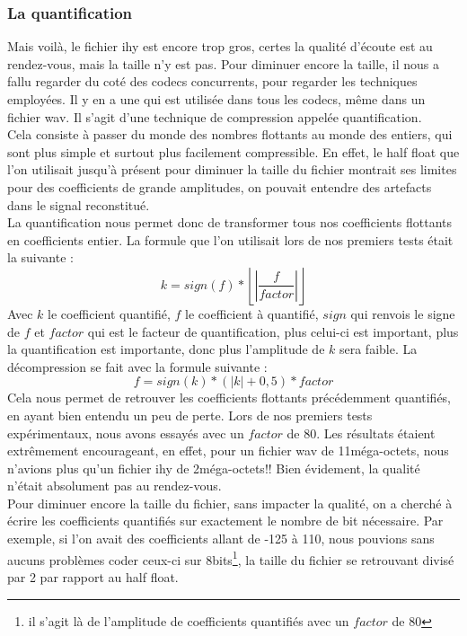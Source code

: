\documentclass[a4paper,12pt]{report}
\begin{document}
\subsubsection{La quantification}
Mais voilà, le fichier ihy est encore trop gros, certes la qualité d'écoute est
au rendez-vous, mais la taille n'y est pas. Pour diminuer encore la taille, il
nous a fallu regarder du coté des codecs concurrents, pour regarder les
techniques employées. Il y en a une qui est utilisée dans tous les codecs, même
dans un fichier wav. Il s'agit d'une technique de compression appelée
quantification.\\
Cela consiste à passer du monde des nombres flottants au monde des entiers, qui
sont plus simple et surtout plus facilement compressible. En effet, le half
float que l'on utilisait jusqu'à présent pour diminuer la taille du fichier
montrait ses limites pour des coefficients de grande amplitudes, on pouvait
entendre des artefacts dans le signal reconstitué.\\
La quantification nous permet donc de transformer tous nos coefficients
flottants en coefficients entier. La formule que l'on utilisait lors de nos
premiers tests était la suivante :
$$ k = sign\left(f\right) * \left\lfloor\left|\frac{f}{factor}\right|
							    \right\rfloor$$
Avec $k$ le coefficient quantifié, $f$ le coefficient à quantifié, $sign$ qui
renvois le signe de $f$ et $factor$ qui est le facteur de quantification, plus
celui-ci est important, plus la quantification est importante, donc plus
l'amplitude de $k$ sera faible. La décompression se fait avec la formule
suivante :
$$ f = sign\left(k\right) * \left(\left|k\right| + 0,5 \right) * factor$$
Cela nous permet de retrouver les coefficients flottants précédemment
quantifiés, en ayant bien entendu un peu de perte. Lors de nos premiers tests
expérimentaux, nous avons essayés avec un $factor$ de 80. Les résultats étaient
extrêmement encourageant, en effet, pour un fichier wav de 11méga-octets, nous
n'avions plus qu'un fichier ihy de 2méga-octets!! Bien évidement, la qualité
n'était absolument pas au rendez-vous.\\
Pour diminuer encore la taille du fichier, sans impacter la qualité, on a
cherché à écrire les coefficients quantifiés sur exactement le nombre de bit
nécessaire. Par exemple, si l'on avait des coefficients allant de -125 à 110,
nous pouvions sans aucuns problèmes coder ceux-ci sur 8bits\footnote{il s'agit
là de l'amplitude de coefficients quantifiés avec un $factor$ de 80}, la taille
du fichier se retrouvant divisé par 2 par rapport au half float.\\
\end{document}
